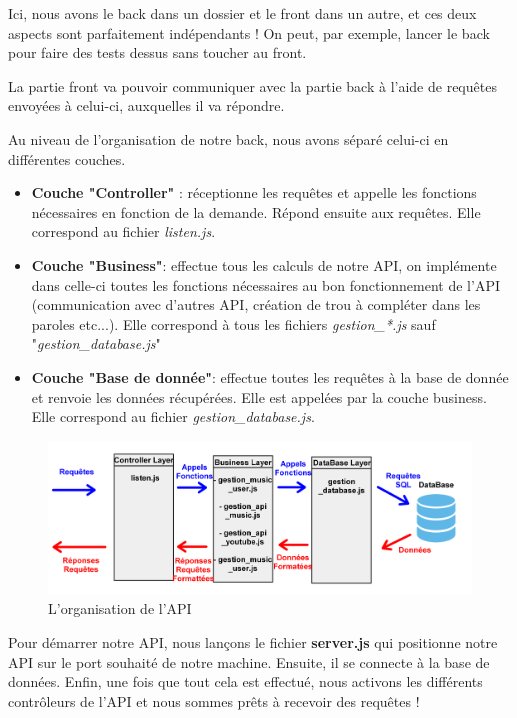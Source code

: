\documentclass[12pt,french]{article}
\begin{document}
Ici, nous avons le back dans un dossier et le front dans un autre, et ces deux aspects sont parfaitement indépendants ! On peut, par exemple, lancer le back pour faire des tests dessus sans toucher au front.

La partie front va pouvoir communiquer avec la partie back à l'aide de requêtes envoyées à celui-ci, auxquelles il va répondre.

\bigskip

Au niveau de l'organisation de notre back, nous avons séparé celui-ci en différentes couches.

\medskip

\begin{itemize}
	\item \textbf{Couche "Controller"} : réceptionne les requêtes et appelle les fonctions nécessaires en fonction de la demande. Répond ensuite aux requêtes. Elle correspond au fichier \textit{listen.js}.
	\item \textbf{Couche "Business"}: effectue tous les calculs de notre API, on implémente dans celle-ci toutes les fonctions nécessaires au bon fonctionnement de l'API (communication avec d'autres API, création de trou à compléter dans les paroles etc...). Elle correspond à tous les fichiers \textit{gestion\_*.js} sauf "\textit{gestion\_database.js}"
	\item \textbf{Couche "Base de donnée"}: effectue toutes les requêtes à la base de donnée et renvoie les données récupérées. Elle est appelées par la couche business. Elle correspond au fichier \textit{gestion\_database.js}.
	
\end{itemize}

\bigskip

\begin{figure}[H]
	\centering
	\includegraphics[scale=0.1]{api_couche.png}
	\caption{
	L'organisation de l'API}    
\end{figure}

\bigskip

Pour démarrer notre API, nous lançons le fichier \textbf{server.js} qui positionne notre API sur le port souhaité de notre machine. Ensuite, il se connecte à la base de données. Enfin, une fois que tout cela est effectué, nous activons les différents contrôleurs de l'API et nous sommes prêts à recevoir des requêtes !
\end{document}
